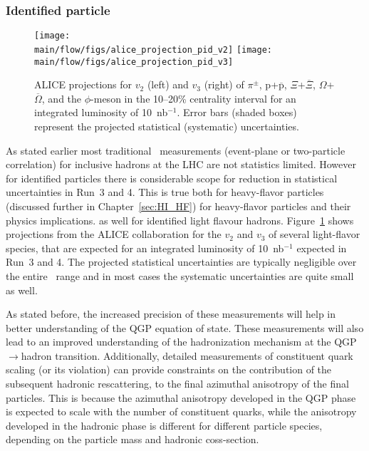 \subsubsection{Identified particle \vn}\label{sec:identified_particle_vn}


\begin{figure}[!htb]
\begin{center}
\texttt{[image: \\main/flow/figs/alice\_projection\_pid\_v2]}
\texttt{[image: \\main/flow/figs/alice\_projection\_pid\_v3]}
\caption{
ALICE projections for $v_2$ (left) and $v_3$ (right) of $\pi^\pm$, 
  $\mathrm{p}$+$\overline{\mathrm{p}}$, $\Xi$+$\overline{\Xi}$, 
  $\Omega$+$\overline{\Omega}$, and the $\phi$-meson 
  in the 10--20\% centrality interval
  for an integrated luminosity of 10~nb$^{-1}$. 
Error bars (shaded boxes) represent the projected statistical 
  (systematic) uncertainties.}
\label{fig:alice_vn}
\end{center}
\end{figure}

As stated earlier most traditional \vn\ measurements (event-plane or 
  two-particle correlation) for inclusive hadrons at the LHC 
  are not statistics limited.
However for identified particles there is considerable scope for reduction 
  in statistical uncertainties in Run~3 and 4.
This is true both for heavy-flavor particles (discussed further in Chapter~\ref{sec:HI_HF})
  for heavy-flavor particles and their physics implications. 
  as well for identified light flavour hadrons.
Figure~\ref{fig:alice_vn} shows projections from the ALICE collaboration for 
  the $v_2$ and $v_3$ of several light-flavor species, that are expected for 
  an integrated luminosity of 10~nb$^{-1}$ expected in Run~3 and 4.
The projected statistical uncertainties are typically negligible over the 
  entire \pt\ range and in most cases the systematic uncertainties are 
  quite small as well.

As stated before, the increased precision of these measurements will help in 
  better understanding of the QGP equation of state. 
These measurements will also lead to an improved understanding 
  of the hadronization mechanism at the QGP$\rightarrow$hadron transition.
Additionally, detailed measurements of constituent quark scaling (or its violation)
  can provide constraints on the contribution of the subsequent hadronic 
  rescattering, to the final azimuthal anisotropy of the final particles.
This is because the azimuthal anisotropy developed in the QGP phase 
  is expected to scale with the 
  number of constituent quarks, while the anisotropy developed in the hadronic
  phase is different for different particle species, depending on the particle 
  mass and hadronic coss-section.


